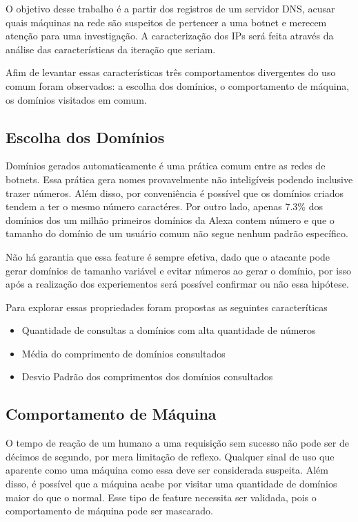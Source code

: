 O objetivo desse trabalho é a partir dos registros de um servidor DNS, acusar quais máquinas na rede são suspeitos de pertencer a uma botnet e merecem atenção para uma investigação. A caracterização dos IPs será feita através da análise das características da iteração que seriam.

Afim de levantar essas características três comportamentos divergentes do uso comum foram observados: a escolha dos domínios, o comportamento de máquina, os domínios visitados em comum.

\subsection{Escolha dos Domínios}
Domínios gerados automaticamente é uma prática comum entre as redes de botnets. Essa prática gera nomes provavelmente não inteligíveis podendo inclusive trazer números. Além disso, por conveniência é possível que os domínios criados tendem a ter o mesmo número caractéres. Por outro lado, apenas 7.3\% dos domínios dos um milhão primeiros domínios da Alexa contem número e que o tamanho do domínio de um usuário comum não segue nenhum padrão específico.

Não há garantia que essa feature é sempre efetiva, dado que o atacante pode gerar domínios de tamanho variável e evitar números ao gerar o domínio, por isso após a realização dos experiementos será possível confirmar ou não essa hipótese.

Para explorar essas propriedades foram propostas as seguintes caracteríticas

\begin{itemize}
\item Quantidade de consultas a domínios com alta quantidade de números
\item Média do comprimento de domínios consultados
\item Desvio Padrão dos comprimentos dos domínios consultados
\end{itemize}

\subsection{Comportamento de Máquina}

O tempo de reação de um humano a uma requisição sem sucesso não pode ser de décimos de segundo, por mera limitação de reflexo. Qualquer sinal de uso que aparente como uma máquina como essa deve ser considerada suspeita. Além disso, é possível que a máquina acabe por visitar uma quantidade de domínios maior do que o normal. Esse tipo de feature necessita ser validada, pois o comportamento de máquina pode ser mascarado.

